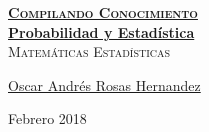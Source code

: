 \documentclass[12pt, fleqn]{report}                             %
\author{Oscar Andrés Rosas}                                     %
\def\ProjectAuthorLink{https://github.com/SoyOscarRH}           %
\def\ProjectNameLink{\ProjectAuthorLink/LibroProbabilidad}      %
\theoremstyle{break}                                            %
\begin{document}
\begin{titlepage}
    
    \pagecolor{TitlePageColor}                                      %
    \color{white}                                                   %

    \vspace                                                         %
    \baselineskip                                                   %

    \makebox[0pt][l]{\rule{1.3\textwidth}{3pt}}                     %
    
    \href{https://compilandoconocimiento.com}                       %
    {\textbf{\textsc{\Huge Compilando Conocimiento}}}\\[2.7cm]      %

    \href{\ProjectNameLink/LibroProbabilidad}                       %
    {\fontsize{36}{50}                                              %
        \selectfont \textbf{Probabilidad y Estadística}}\\[0.5cm]   %
    \textcolor{ColorSubtext}                                        %
        {\textsc{\LARGE Matemáticas Estadísticas}}                  %
    
    \vfill                                                          %
    
    \href{https://compilandoconocimiento.com/yo}                    %
    {\LARGE \textsf{Oscar Andrés Rosas Hernandez}}                  %

    \vspace                                                         %
    \baselineskip                                                   %
    
    {\large \textsf{Febrero 2018}}                                  %

\end{titlepage}
\end{document}
